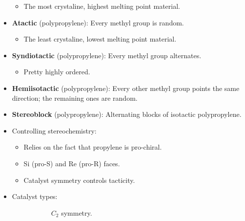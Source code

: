 \documentclass[../notes.tex]{subfiles}
\begin{document}
\begin{itemize}
    \begin{itemize}
        \item The most crystaline, highest melting point material.
    \end{itemize}
    \item \textbf{Atactic} (polypropylene): Every methyl group is random.
    \begin{itemize}
        \item The least crystaline, lowest melting point material.
    \end{itemize}
    \item \textbf{Syndiotactic} (polypropylene): Every methyl group alternates.
    \begin{itemize}
        \item Pretty highly ordered.
    \end{itemize}
    \item \textbf{Hemiisotactic} (polypropylene): Every other methyl group points the same direction; the remaining ones are random.
    \item \textbf{Stereoblock} (polypropylene): Alternating blocks of isotactic polypropylene.
    \item Controlling stereochemistry:
    \begin{itemize}
        \item Relies on the fact that propylene is pro-chiral.
        \item Si (pro-S) and Re (pro-R) faces.
        \item Catalyst symmetry controls tacticity.
    \end{itemize}
    \item Catalyst types:
    \begin{figure}[h!]
        \centering
        \begin{subfigure}[b]{0.3\linewidth}
            \centering
            \caption{$C_2$ symmetry.}
            \label{fig:catalysts-polypropylenea}
        \end{subfigure}
        \begin{subfigure}[b]{0.3\linewidth}
            \centering
\end{subfigure}
\end{figure}
\end{itemize}
\end{document}

